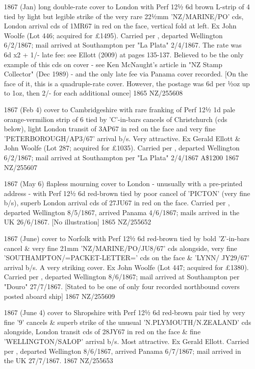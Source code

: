 \documentclass[justified]{tufte-book}
\begin{document}
%
{1867 (Jan) long double-rate cover to London with Perf 12½ 6d brown L-strip of 4 tied by light but legible strike of the very rare 22½mm 'NZ/MARINE/PO' cds, London arrival cds of 1MR67 in red on the face, vertical fold at left. Ex John Woolfe (Lot 446; acquired for £1495). Carried per , departed Wellington 6/2/1867; mail arrived at Southampton per "La Plata" 2/4/1867. The rate was 6d x2 + 1/- late fee: see Ellott (2009) at pages 135-137. Believed to be the only example of this cds on cover - see Ken McNaught's article in "NZ Stamp Collector" (Dec 1989) - and the only late fee via Panama cover recorded. [On the face of it, this is a quadruple-rate cover. However, the postage was 6d per ½oz up to 1oz, then 2/- for each additional ounce]}%
{1865}%
{NZ/255608}%
{}%
{}
{}%
{}

%
{1867 (Feb 4) cover to Cambridgeshire with rare franking of Perf 12½ 1d pale orange-vermilion strip of 6 tied by 'C'-in-bars cancels of Christchurch (cds below), light London transit of 3AP67 in red on the face and very fine 'PETERBOROUGH/AP3/67' arrival b/s. Very attractive. Ex Gerald Ellott \& John Woolfe (Lot 287; acquired for \pounds{1035}). Carried per , departed Wellington 6/2/1867; mail arrived at Southampton per "La Plata" 2/4/1867  A\$1200}%
{1867}%
{NZ/255607}%
{}%
{}
{}%
{}


%
{1867 (May 6) flapless mourning cover to London - unusually with a pre-printed address - with Perf 12½ 6d red-brown tied by poor cancel of 'PICTON' (very fine b/s), superb London arrival cds of 27JU67 in red on the face. Carried per , departed Wellington 8/5/1867, arrived Panama 4/6/1867; mails arrived in the UK 26/6/1867. [No illustration] }%
{1865}%
{NZ/255652}%
{}%
{}
{}%
{}

%
{1867 (June) cover to Norfolk with Perf 12½ 6d red-brown tied by bold 'Z'-in-bars cancel \& very fine 21mm 'NZ/MARINE/PO/JU8/67' cds alongside, very fine 'SOUTHAMPTON/=PACKET-LETTER=' cds on the face \& 'LYNN/ JY29/67' arrival b/s. A very striking cover. Ex John Woolfe (Lot 447; acquired for \pounds{1380}). Carried per , departed Wellington 8/6/1867; mail arrived at Southampton per "Douro" 27/7/1867. [Stated to be one of only four recorded northbound covers posted aboard ship] }%
{1867}%
{NZ/255609}%
{}%
{}
{}%
{}

%
{1867 (June 4) cover to Shropshire with Perf 12½ 6d red-brown pair tied by very fine '9' cancels \& superb strike of the unusual 'N.PLYMOUTH/N.ZEALAND' cds alongside, London transit cds of 28JY67 in red on the face \& fine 'WELLINGTON/SALOP' arrival b/s. Most attractive. Ex Gerald Ellott. Carried per , departed Wellington 8/6/1867, arrived Panama 6/7/1867; mail arrived in the UK 27/7/1867. }%
{1867}%
{NZ/255653}%
{}%
{}
{}%
{}
\end{document}

